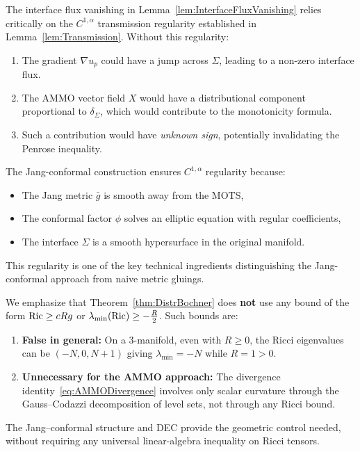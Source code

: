 \begin{remark}\label{rem:TransmissionEssential}
The interface flux vanishing in Lemma~\ref{lem:InterfaceFluxVanishing} relies critically on the $C^{1,\alpha}$ transmission regularity established in Lemma~\ref{lem:Transmission}. Without this regularity:
\begin{enumerate}
    \item The gradient $\nabla u_p$ could have a jump across $\Sigma$, leading to a non-zero interface flux.
    \item The AMMO vector field $X$ would have a distributional component proportional to $\delta_\Sigma$, which would contribute to the monotonicity formula.
    \item Such a contribution would have \emph{unknown sign}, potentially invalidating the Penrose inequality.
\end{enumerate}
The Jang-conformal construction ensures $C^{1,\alpha}$ regularity because:
\begin{itemize}
    \item The Jang metric $\bar{g}$ is smooth away from the MOTS,
    \item The conformal factor $\phi$ solves an elliptic equation with regular coefficients,
    \item The interface $\Sigma$ is a smooth hypersurface in the original manifold.
\end{itemize}
This regularity is one of the key technical ingredients distinguishing the Jang-conformal approach from naive metric gluings.
\end{remark}

\begin{remark}\label{rem:NoRicciScalarBound}
We emphasize that Theorem~\ref{thm:DistrBochner} does \textbf{not} use any bound of the form $\mathrm{Ric} \ge cRg$ or $\lambda_{\min}(\mathrm{Ric}) \ge -\frac{R}{2}$. Such bounds are:
\begin{enumerate}
    \item \textbf{False in general:} On a 3-manifold, even with $R \ge 0$, the Ricci eigenvalues can be $(-N, 0, N+1)$ giving $\lambda_{\min} = -N$ while $R = 1 > 0$.
    \item \textbf{Unnecessary for the AMMO approach:} The divergence identity~\eqref{eq:AMMODivergence} involves only scalar curvature through the Gauss--Codazzi decomposition of level sets, not through any Ricci bound.
\end{enumerate}
The Jang--conformal structure and DEC provide the geometric control needed, without requiring any universal linear-algebra inequality on Ricci tensors.
\end{remark}

